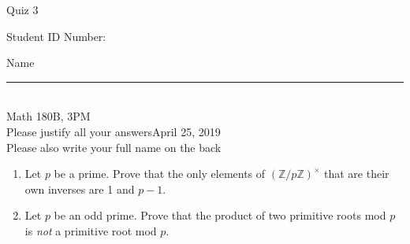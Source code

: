 \documentclass[12pt]{article}
\newcommand{\integers}{\mathbb{Z}}
\begin{document}
\begin{flushleft} 
\centerline{\LARGE{Quiz 3}} 
\vspace{5 mm}
{Student ID Number:}\hfill  
{Name \rule {2 in}{0.01in}}\\
Math 180B, 3PM
\\
{Please justify all your answers}\hfill {April 25, 2019}
\\
{Please also write your full name on the back} 

\medskip
\end{flushleft}

\begin{enumerate}
	\item Let $p$ be a prime. Prove that the only elements of $(\integers/p\integers)^\times$ that are their own inverses are 1 and $p-1$.
	\vfill
	\item Let $p$ be an odd prime. Prove that the product of two primitive roots mod $p$ is \textit{not} a primitive root mod $p$.
	\vfill
\end{enumerate}

\end{document}
